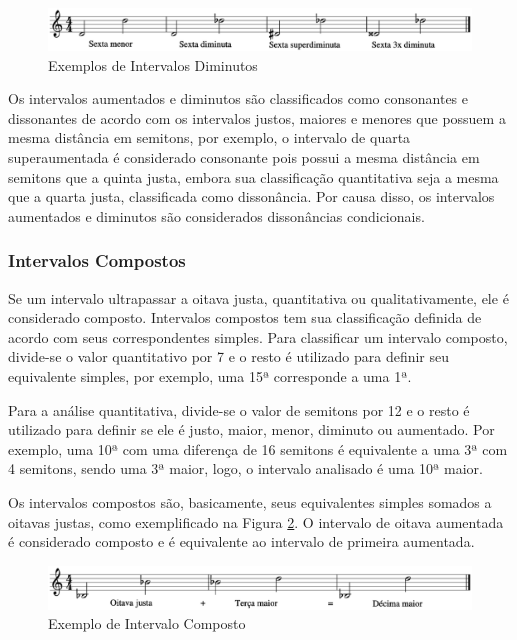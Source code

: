         \begin{figure}[htb]
          \centering
          \includegraphics[scale=0.4]{figuras/diminutas.eps}
          \caption{Exemplos de Intervalos Diminutos}
          \label{diminutas}
        \end{figure}


        Os intervalos aumentados e diminutos são classificados como consonantes e dissonantes de acordo com os intervalos justos, maiores e menores que possuem a mesma distância em semitons, por exemplo, o intervalo de quarta superaumentada é considerado consonante pois possui a mesma distância em semitons que a quinta justa, embora sua classificação quantitativa seja a mesma que a quarta justa, classificada como dissonância. Por causa disso, os intervalos aumentados e diminutos são considerados dissonâncias condicionais.

      \subsubsection[Intervalos Compostos]{Intervalos Compostos}

        Se um intervalo ultrapassar a oitava justa, quantitativa ou qualitativamente, ele é considerado composto. Intervalos compostos tem sua classificação definida de acordo com seus correspondentes simples. Para classificar um intervalo composto, divide-se o valor quantitativo por 7 e o resto é utilizado para definir seu equivalente simples, por exemplo, uma 15ª corresponde a uma 1ª.

        Para a análise quantitativa, divide-se o valor de semitons por 12 e o resto é utilizado para definir se ele é justo, maior, menor, diminuto ou aumentado. Por exemplo, uma 10ª com uma diferença de 16 semitons é equivalente a uma 3ª com 4 semitons, sendo uma 3ª maior, logo, o intervalo analisado é uma 10ª maior.

        Os intervalos compostos são, basicamente, seus equivalentes simples somados a oitavas justas, como exemplificado na Figura \ref{compostos}. O intervalo de oitava aumentada é considerado composto e é equivalente ao intervalo de primeira aumentada.

        \begin{figure}[htb]
          \centering
          \includegraphics[scale=0.4]{figuras/compostos.eps}
          \caption{Exemplo de Intervalo Composto}
          \label{compostos}
        \end{figure}


